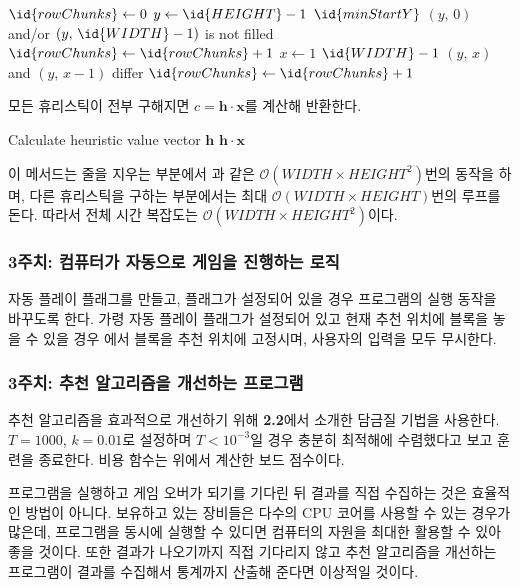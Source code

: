 \begin{codebox}
\li $\id{rowChunks} \gets 0$
\li \For $y \gets \id{HEIGHT} - 1$ \Downto $\id{minStartY}$ \Do
\li     \If $(y,\,0)$ and/or $(y,\,\id{WIDTH}-1)$ is not filled \Then
\li         $\id{rowChunks} \gets \id{rowChunks} + 1$
        \End
\li     \For $x \gets 1$ \To $\id{WIDTH} - 1$ \Do
\li         \If $(y,\,x)$ and $(y,\,x - 1)$ differ \Then
\li             $\id{rowChunks} \gets \id{rowChunks} + 1$
            \End
        \End
    \End    
\end{codebox}

모든 휴리스틱이 전부 구해지면 $c = \mathbf{h} \cdot \mathbf{x}$를 계산해 반환한다.

\begin{codebox}
\li Calculate heuristic value vector $\mathbf{h}$
\li \Return $\mathbf{h} \cdot \mathbf{x}$
\end{codebox}

이 메서드는 줄을 지우는 부분에서 과 같은
$\mathcal{O}\left(WIDTH \times HEIGHT^2\right)$번의 동작을 하며, 다른 휴리스틱을 구하는 부분에서는
최대 $\mathcal{O}\left(WIDTH \times HEIGHT\right)$번의 루프를 돈다. 따라서 전체 시간 복잡도는
$\mathcal{O}\left(WIDTH \times HEIGHT^2\right)$이다.

\subsubsection{3주치: 컴퓨터가 자동으로 게임을 진행하는 로직} 자동 플레이 플래그를 만들고,
플래그가 설정되어 있을 경우 프로그램의 실행 동작을 바꾸도록 한다. 가령 자동 플레이 플래그가
설정되어 있고 현재 추천 위치에 블록을 놓을 수 있을 경우 에서 블록을
추천 위치에 고정시며, 사용자의 입력을 모두 무시한다.

\subsubsection{3주치: 추천 알고리즘을 개선하는 프로그램} 추천 알고리즘을 효과적으로 개선하기 위해
\textbf{2.2}에서 소개한 담금질 기법을 사용한다. $T=1000$, $k=0.01$로 설정하며 $T<10^{-3}$일 경우
충분히 최적해에 수렴했다고 보고 훈련을 종료한다. 비용 함수는 위에서 계산한 보드 점수이다.

프로그램을 실행하고 게임 오버가 되기를 기다린 뒤 결과를 직접 수집하는 것은 효율적인 방법이 아니다. 보유하고 있는
장비들은 다수의 CPU 코어를 사용할 수 있는 경우가 많은데, 프로그램을 동시에 실행할 수 있디면 컴퓨터의 자원을
최대한 활용할 수 있아 좋을 것이다. 또한 결과가 나오기까지 직접 기다리지 않고 추천 알고리즘을 개선하는 프로그램이
결과를 수집해서 통계까지 산출해 준다면 이상적일 것이다.

